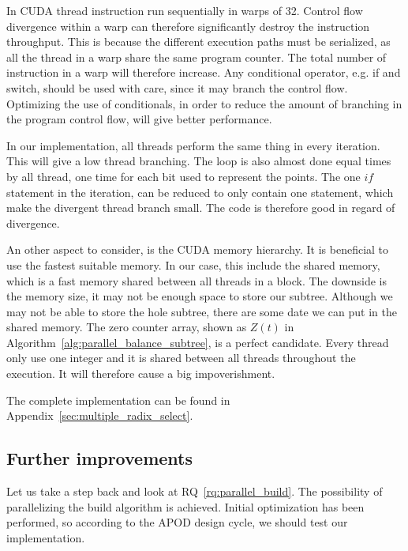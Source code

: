 In CUDA thread instruction run sequentially in warps of 32. Control flow divergence within a warp can therefore significantly destroy the instruction throughput. This is because the different execution paths must be serialized, as all the thread in a warp share the same program counter\cite{cuda_c_best_practices_guide}. The total number of instruction in a warp will therefore increase. Any conditional operator, e.g. if and switch, should be used with care, since it may branch the control flow. Optimizing the use of conditionals, in order to reduce the amount of branching in the program control flow, will give better performance.

In our implementation, all threads perform the same thing in every iteration. This will give a low thread branching. The loop is also almost done equal times by all thread, one time for each bit used to represent the points. The one $if$ statement in the iteration, can be reduced to only contain one statement, which make the divergent thread branch small. The code is therefore good in regard of divergence.

An other aspect to consider, is the CUDA memory hierarchy. It is beneficial to use the fastest suitable memory. In our case, this include the shared memory, which is a fast memory shared between all threads in a block. The downside is the memory size, it may not be enough space to store our subtree. Although we may not be able to store the hole subtree, there are some date we can put in the shared memory. The zero counter array, shown as $Z(t)$ in Algorithm~\ref{alg:parallel_balance_subtree}, is a perfect candidate. Every thread only use one integer and it is shared between all threads throughout the execution. It will therefore cause a big impoverishment.

The complete implementation can be found in Appendix~\ref{sec:multiple_radix_select}.

\subsection{Further improvements} %
\label{ssub:further_development}

Let us take a step back and look at RQ~\ref{rq:parallel_build}. The possibility of parallelizing the build algorithm is achieved. Initial optimization has been performed, so according to the APOD design cycle, we should test our implementation.


